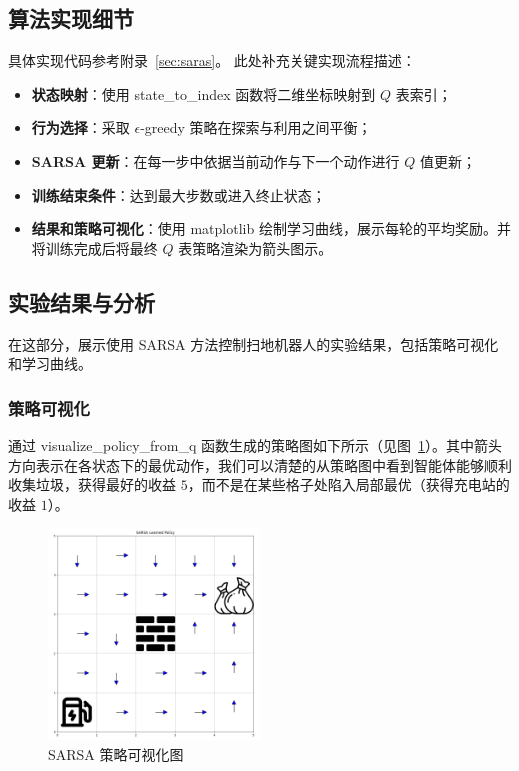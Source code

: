\subsection{算法实现细节}

具体实现代码参考附录~\ref{sec:saras}。
此处补充关键实现流程描述：
\begin{itemize}
    \item \textbf{状态映射}：使用 \textsf{state\_to\_index} 函数将二维坐标映射到 \(Q\) 表索引；
    \item \textbf{行为选择}：采取 \(\epsilon\)-greedy 策略在探索与利用之间平衡；
    \item \textbf{SARSA 更新}：在每一步中依据当前动作与下一个动作进行 \(Q\) 值更新；
    \item \textbf{训练结束条件}：达到最大步数或进入终止状态；
    \item \textbf{结果和策略可视化}：使用 matplotlib 绘制学习曲线，展示每轮的平均奖励。并将训练完成后将最终 \(Q\) 表策略渲染为箭头图示。
\end{itemize}

\subsection{实验结果与分析}

在这部分，展示使用 SARSA 方法控制扫地机器人的实验结果，包括策略可视化和学习曲线。

\subsubsection{策略可视化}

通过 \textsf{visualize\_policy\_from\_q} 函数生成的策略图如下所示（见图~\ref{fig:sarsa_policy}）。其中箭头方向表示在各状态下的最优动作，我们可以清楚的从策略图中看到智能体能够顺利收集垃圾，获得最好的收益 \(5\)，而不是在某些格子处陷入局部最优（获得充电站的收益 \(1\)）。

\begin{figure}[htbp] 
    \centering 
    \includegraphics[width=0.5\textwidth]{figure/sweep_robot/sarsa/policy_visualization.png} 
    \caption{SARSA 策略可视化图}\label{fig:sarsa_policy} 
\end{figure}

